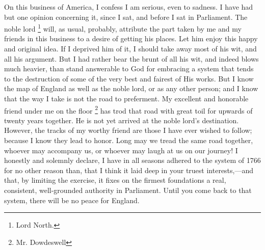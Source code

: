 On this business of America, I confess I am serious, even to sadness. I have had but one opinion concerning it, since I sat, and before I sat in Parliament. The noble lord
\footnote{Lord North.}
will, as usual, probably, attribute the part taken by me and my friends in this business to a desire of getting his places. Let him enjoy this happy and original idea. If I deprived him of it, I should take away most of his wit, and all his argument. But I had rather bear the brunt of all his wit, and indeed blows much heavier, than stand answerable to God for embracing a system that tends to the destruction of some of the very best and fairest of His works. But I know the map of England as well as the noble lord, or as any other person; and I know that the way I take is not the road to preferment. My excellent and honorable friend under me on the floor
\footnote{Mr. Dowdeswell}
has trod that road with great toil for upwards of twenty years together. He is not yet arrived at the noble lord's destination. However, the tracks of my worthy friend are those I have ever wished to follow; because I know they lead to honor. Long may we tread the same road together, whoever may accompany us, or whoever may laugh at us on our journey! I honestly and solemnly declare, I have in all seasons adhered to the system of 1766 for no other reason than, that I think it laid deep in your truest interests,—and that, by limiting the exercise, it fixes on the firmest foundations a real, consistent, well-grounded authority in Parliament. Until you come back to that system, there will be no peace for England.




